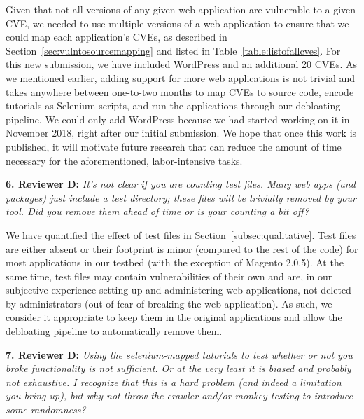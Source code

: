 \noindent Given that not all versions of any given web application are vulnerable to a given CVE, we needed to use multiple versions of a web application to ensure that we could map each application's CVEs, as described in Section~\ref{sec:vulntosourcemapping} and listed in Table~\ref{table:listofallcves}. For this new submission, we have included WordPress and an additional 20 CVEs. As we mentioned earlier, adding support for more web applications is not trivial and takes anywhere between one-to-two months to map CVEs to source code, encode tutorials as Selenium scripts, and run the applications through our debloating pipeline. We could only add WordPress because we had started working on it in November 2018, right after our initial submission. We hope that once this work is published, it will motivate future research that can reduce the amount of time necessary for the aforementioned, labor-intensive tasks.

\vspace{1ex}

\noindent \textbf{6. Reviewer D:} \textit{It's not clear if you are counting test files. Many web apps (and packages) just include a test directory; these files will be trivially removed by your tool. Did you remove them ahead of time or is your counting a bit off?}
\vspace{0.5ex}

\noindent We have quantified the effect of test files in Section~\ref{subsec:qualitative}. Test files are either absent or their footprint is minor (compared to the rest of the code) for most applications in our testbed (with the exception of Magento 2.0.5). At the same time, test files may contain vulnerabilities of their own and are, in our subjective experience setting up and administering web applications, not deleted by administrators (out of fear of breaking the web application). As such, we consider it appropriate to keep them in the original applications and allow the debloating pipeline to automatically remove them.

\vspace{1ex}

\noindent  \textbf{7. Reviewer D:} \textit{Using the selenium-mapped tutorials to test whether or not you broke functionality is not sufficient. Or at the very least it is biased and probably not exhaustive.  I recognize that this is a hard problem (and indeed a limitation you bring up), but why not throw the crawler and/or monkey testing to introduce some randomness?}
\vspace{0.5ex}

